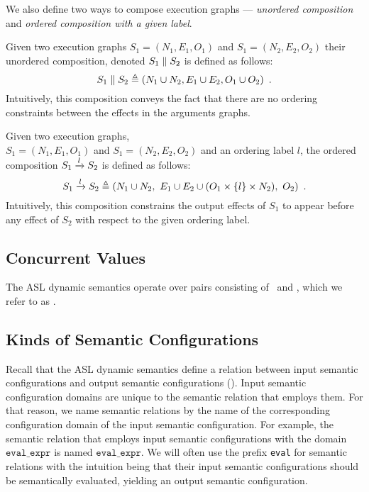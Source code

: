 We also define two ways to compose execution graphs --- \emph{unordered composition} and
\emph{ordered composition with a given label}.

\hypertarget{def-parallel}{}
\begin{definition}
Given two execution graphs $S_1 = (N_1, E_1, O_1)$ and $S_1 = (N_2, E_2, O_2)$ their unordered composition,
denoted $S_1 \parallel S_2$ is defined as follows:
\[
  S_1 \parallelcomp S_2\triangleq (N_1 \cup N_2, E_1 \cup E_2, O_1 \cup O_2) \enspace.
\]
Intuitively, this composition conveys the fact that there are no ordering constraints between the effects
in the arguments graphs.
\end{definition}

\hypertarget{def-ordered}{}
\begin{definition}
Given two execution graphs, \\ $S_1 = (N_1, E_1, O_1)$ and $S_1 = (N_2, E_2, O_2)$ and an ordering label $l$,
the ordered composition ${S_1}\xrightarrow{l}{S_2}$ is defined as follows:
\[
  \ordered{S_1}{l}{S_2} \triangleq (N_1 \cup N_2,\ E_1 \cup E_2 \cup (O_1 \times \{l\} \times N_2),\ O_2) \enspace.
\]
Intuitively, this composition constrains the output effects of $S_1$ to appear before any effect of $S_2$ with respect
to the given ordering label.
\end{definition}

\subsection{Concurrent Values\label{sec:ConcurrentValues}}
\hypertarget{def-concurrentnativevalue}{}
The ASL dynamic semantics operate over pairs consisting of \nativevalues\ and \executiongraphs,
which we refer to as \concurrentnativevalues.

\subsection{Kinds of Semantic Configurations\label{sec:KindsOfSemanticConfigurations}}

Recall that the ASL dynamic semantics define a relation between input semantic configurations and output semantic configurations
().
Input semantic configuration domains are unique to the semantic relation that employs them.
For that reason, we name semantic relations by the name of the corresponding configuration domain of the input semantic configuration.
For example, the semantic relation that employs input semantic configurations with the domain $\texttt{eval\_expr}$
is named $\texttt{eval\_expr}$.
%
We will often use the prefix \texttt{eval} for semantic relations with the intuition being that their input semantic configurations
should be semantically evaluated, yielding an output semantic configuration.

